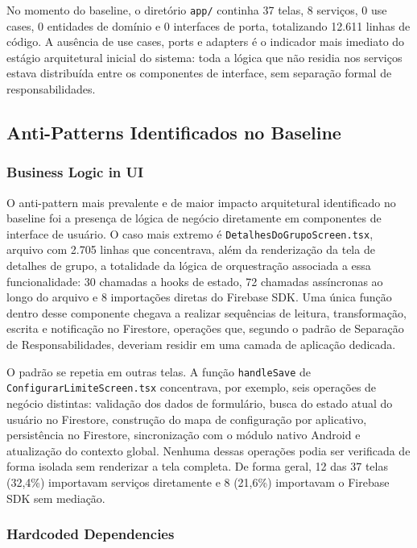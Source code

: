\documentclass[sigconf,anonymous]{acmart}
\begin{document}
No momento do baseline, o diretório \texttt{app/} continha 37 telas, 8 serviços, 0 use cases, 0 entidades de domínio e 0 interfaces de porta, totalizando 12.611 linhas de código. A ausência de use cases, ports e adapters é o indicador mais imediato do estágio arquitetural inicial do sistema: toda a lógica que não residia nos serviços estava distribuída entre os componentes de interface, sem separação formal de responsabilidades.

\subsection{Anti-Patterns Identificados no Baseline}

\subsubsection{Business Logic in UI}

O anti-pattern mais prevalente e de maior impacto arquitetural identificado no baseline foi a presença de lógica de negócio diretamente em componentes de interface de usuário. O caso mais extremo é \texttt{DetalhesDoGrupoScreen.tsx}, arquivo com 2.705 linhas que concentrava, além da renderização da tela de detalhes de grupo, a totalidade da lógica de orquestração associada a essa funcionalidade: 30 chamadas a hooks de estado, 72 chamadas assíncronas ao longo do arquivo e 8 importações diretas do Firebase SDK. Uma única função dentro desse componente chegava a realizar sequências de leitura, transformação, escrita e notificação no Firestore, operações que, segundo o padrão de Separação de Responsabilidades, deveriam residir em uma camada de aplicação dedicada.

O padrão se repetia em outras telas. A função \texttt{handleSave} de \texttt{ConfigurarLimiteScreen.tsx} concentrava, por exemplo, seis operações de negócio distintas: validação dos dados de formulário, busca do estado atual do usuário no Firestore, construção do mapa de configuração por aplicativo, persistência no Firestore, sincronização com o módulo nativo Android e atualização do contexto global. Nenhuma dessas operações podia ser verificada de forma isolada sem renderizar a tela completa. De forma geral, 12 das 37 telas (32,4\%) importavam serviços diretamente e 8 (21,6\%) importavam o Firebase SDK sem mediação.

\subsubsection{Hardcoded Dependencies}
\end{document}
